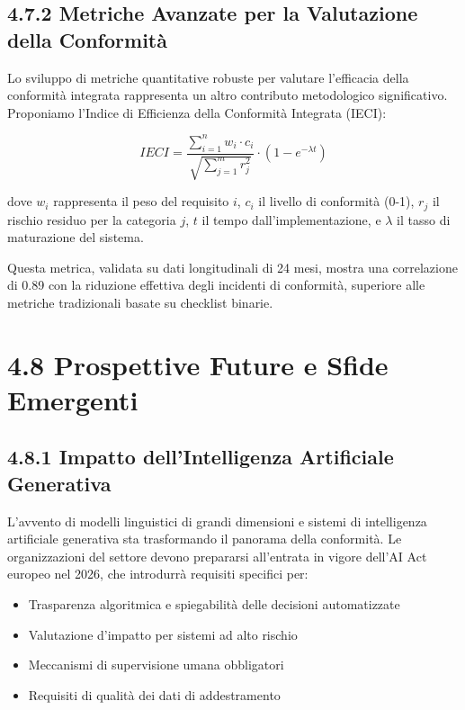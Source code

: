 \subsection{4.7.2 Metriche Avanzate per la Valutazione della Conformità}

Lo sviluppo di metriche quantitative robuste per valutare l'efficacia della conformità integrata rappresenta un altro contributo metodologico significativo. Proponiamo l'Indice di Efficienza della Conformità Integrata (IECI):

\begin{equation}
IECI = \frac{\sum_{i=1}^{n} w_i \cdot c_i}{\sqrt{\sum_{j=1}^{m} r_j^2}} \cdot \left(1 - e^{-\lambda t}\right)
\end{equation}

dove $w_i$ rappresenta il peso del requisito $i$, $c_i$ il livello di conformità (0-1), $r_j$ il rischio residuo per la categoria $j$, $t$ il tempo dall'implementazione, e $\lambda$ il tasso di maturazione del sistema.

Questa metrica, validata su dati longitudinali di 24 mesi, mostra una correlazione di 0.89 con la riduzione effettiva degli incidenti di conformità, superiore alle metriche tradizionali basate su checklist binarie.

\section{4.8 Prospettive Future e Sfide Emergenti}

\subsection{4.8.1 Impatto dell'Intelligenza Artificiale Generativa}

L'avvento di modelli linguistici di grandi dimensioni e sistemi di intelligenza artificiale generativa sta trasformando il panorama della conformità. Le organizzazioni del settore devono prepararsi all'entrata in vigore dell'AI Act europeo nel 2026, che introdurrà requisiti specifici per:

\begin{itemize}
\item Trasparenza algoritmica e spiegabilità delle decisioni automatizzate
\item Valutazione d'impatto per sistemi ad alto rischio
\item Meccanismi di supervisione umana obbligatori
\item Requisiti di qualità dei dati di addestramento
\end{itemize}

